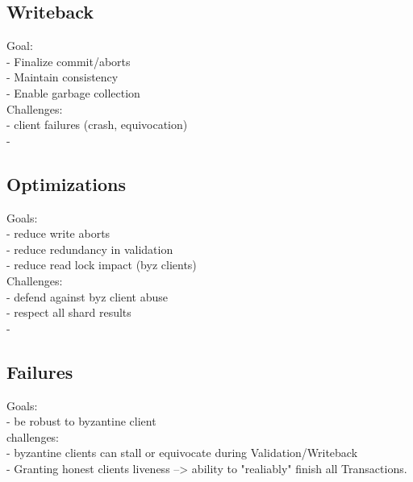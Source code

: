 \subsection{Writeback}
Goal: \\
- Finalize commit/aborts\\
- Maintain consistency\\
- Enable garbage collection\\

Challenges:\\
- client failures (crash, equivocation)\\
- 


\subsection{Optimizations}
Goals:\\
- reduce write aborts\\
- reduce redundancy in validation\\
- reduce read lock impact (byz clients)\\

Challenges:\\
- defend against byz client abuse\\
- respect all shard results\\
- 

\subsection{Failures}
Goals:\\
- be robust to byzantine client\\


challenges:\\
- byzantine clients can stall or equivocate during Validation/Writeback\\
- Granting honest clients liveness --> ability to "realiably" finish all Transactions.\\